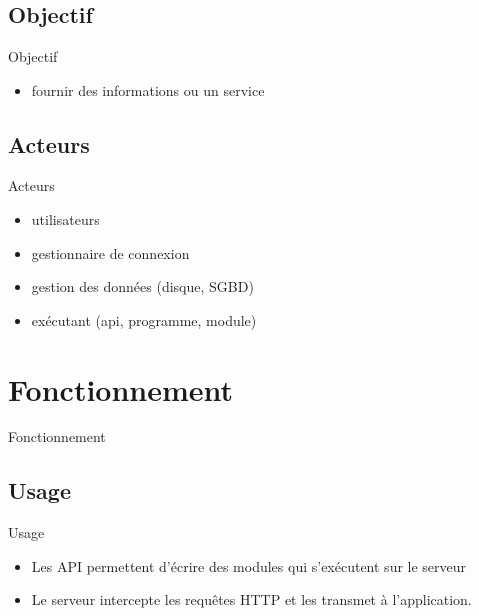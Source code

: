 \section{\sectitle}
\begin{frame}{\sectitle}
    \def\subsectitle{Objectif}
    \subsection{\subsectitle}
    \begin{block}{\subsectitle}
        \begin{itemize}
            \item fournir des informations ou un service
        \end{itemize}
    \end{block}
    \def\subsectitle{Acteurs}
    \subsection{\subsectitle}
    \begin{block}{\subsectitle}
        \begin{itemize}
            \item utilisateurs
            \item gestionnaire de connexion
            \item gestion des données (disque, SGBD)
            \item exécutant (api, programme, module)
        \end{itemize}
    \end{block}
\end{frame}

\def\sectitle{Fonctionnement}
\section{\sectitle}
\begin{frame}{\sectitle}
    \def\subsectitle{Usage}
    \subsection{\subsectitle}
    \begin{block}{\subsectitle}
        \begin{itemize}
            \item Les API permettent d'écrire des modules qui s'exécutent sur le
                serveur
            \item Le serveur intercepte les requêtes HTTP et les transmet à
                l'application.
        \end{itemize}
    \end{block}
\end{frame}

